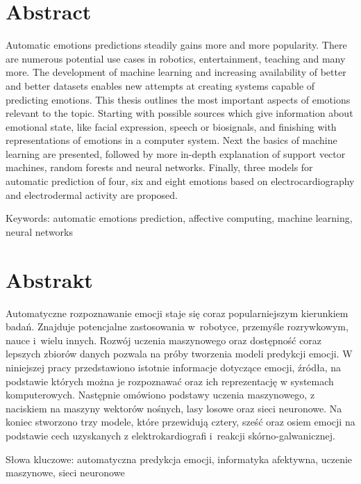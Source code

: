 \section*{Abstract}\label{sec:abstract}

Automatic emotions predictions steadily gains more and more popularity.
There are numerous potential use cases in robotics, entertainment, teaching and many more.
The development of machine learning and increasing availability of better and better datasets enables new attempts at creating systems capable of predicting emotions.
This thesis outlines the most important aspects of emotions relevant to the topic.
Starting with possible sources which give information about emotional state, like facial expression, speech or biosignals, and finishing with representations of emotions in a computer system.
Next the basics of machine learning are presented, followed by more in-depth explanation of support vector machines, random forests and neural networks.
Finally, three models for automatic prediction of four, six and eight emotions based on electrocardiography and electrodermal activity are proposed.

Keywords: automatic emotions prediction, affective computing, machine learning, neural networks

\section*{Abstrakt}\label{sec:abstrakt}

Automatyczne rozpoznawanie emocji staje się coraz popularniejszym kierunkiem badań.
Znajduje potencjalne zastosowania w~robotyce, przemyśle rozrywkowym, nauce i~wielu innych.
Rozwój uczenia maszynowego oraz dostępność coraz lepszych zbiorów danych pozwala na próby tworzenia modeli predykcji emocji.
W niniejszej pracy przedstawiono istotnie informacje dotyczące emocji, źródła, na podstawie których można je rozpoznawać oraz ich reprezentację w systemach komputerowych.
Następnie omówiono podstawy uczenia maszynowego, z naciskiem na maszyny wektorów nośnych, lasy losowe oraz sieci neuronowe.
Na koniec stworzono trzy modele, które przewidują cztery, sześć oraz osiem emocji na podstawie cech uzyskanych z elektrokardiografi i~reakcji skórno-galwanicznej.

Słowa kluczowe: automatyczna predykcja emocji, informatyka afektywna, uczenie maszynowe, sieci neuronowe
